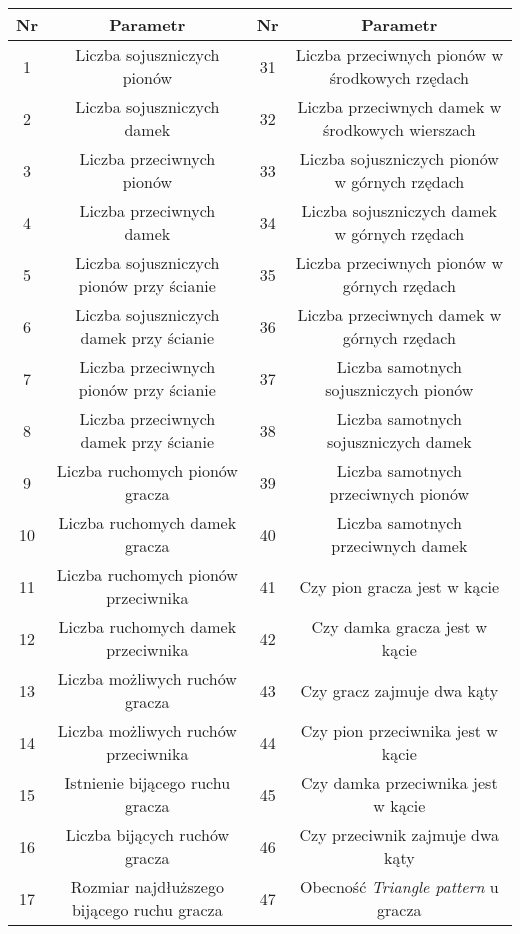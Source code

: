 \label{params}

{
\begin{center}
\begin{table}
\centering
{\footnotesize
\begin{tabular}{|c | c || c | c|}
 \hline
 Nr & Parametr & Nr & Parametr \\ %
 \hline\hline
 1 & Liczba sojuszniczych pionów & 31 & Liczba przeciwnych pionów w środkowych rzędach \\ 
 \hline
 2 & Liczba sojuszniczych damek & 32 & Liczba przeciwnych damek w środkowych wierszach \\
 \hline
 3 & Liczba przeciwnych pionów & 33 & Liczba sojuszniczych pionów w górnych rzędach \\
 \hline
 4 & Liczba przeciwnych damek & 34 & Liczba sojuszniczych damek w górnych rzędach \\
 \hline
 5 & Liczba sojuszniczych pionów przy ścianie & 35 & Liczba przeciwnych pionów w górnych rzędach \\
 \hline
 6 & Liczba sojuszniczych damek przy ścianie & 36 & Liczba przeciwnych damek w górnych rzędach \\ 
 \hline
 7 & Liczba przeciwnych pionów przy ścianie & 37 & Liczba samotnych sojuszniczych pionów \\
 \hline
 8 & Liczba przeciwnych damek przy ścianie & 38 & Liczba samotnych sojuszniczych damek \\
 \hline
 9 & Liczba ruchomych pionów gracza & 39 & Liczba samotnych przeciwnych pionów \\
 \hline
 10 & Liczba ruchomych damek gracza & 40 & Liczba samotnych przeciwnych damek \\
 \hline
 11 & Liczba ruchomych pionów przeciwnika & 41 & Czy pion gracza jest w kącie \\ 
 \hline
 12 & Liczba ruchomych damek przeciwnika & 42 & Czy damka gracza jest w kącie \\
 \hline
 13 & Liczba możliwych ruchów gracza & 43 & Czy gracz zajmuje dwa kąty \\
 \hline
 14 & Liczba możliwych ruchów przeciwnika & 44 & Czy pion przeciwnika jest w kącie \\
 \hline
 15 & Istnienie bijącego ruchu gracza & 45 & Czy damka przeciwnika jest w kącie \\
 \hline
 16 & Liczba bijących ruchów gracza & 46 & Czy przeciwnik zajmuje dwa kąty \\ 
 \hline
 17 & Rozmiar najdłuższego bijącego ruchu gracza & 47 & Obecność \textit{Triangle pattern} u gracza \\

\end{tabular}}
\end{table}
\end{center}}
